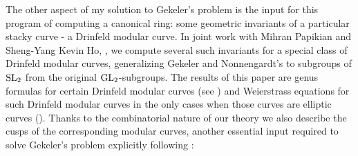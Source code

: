 \documentclass[12pt]{amsart}
\begin{document}
	 The other aspect of my solution to Gekeler's problem is the input for this program of computing a canonical ring: some geometric invariants of a particular stacky curve - a Drinfeld modular curve. In joint work with Mihran Papikian and Sheng-Yang Kevin Ho, \cite{Franklin-Ho-Papikian-DrinfeldCurves-SL}, we compute several such invariants for a special class of Drinfeld modular curves, generalizing Gekeler and Nonnengardt's \cite{Gekeler-Nonnengardt-BruhatTitsTrees} to subgroups of $\mathrm{SL}_2$ from the original $\mathrm{GL}_2$-subgroups. The results of this paper are genus formulas for certain Drinfeld modular curves (see \cite[Section $3$]{Franklin-Ho-Papikian-DrinfeldCurves-SL}) and Weierstrass equations for such Drinfeld modular curves in the only cases when those curves are elliptic curves (\cite[Section $4$]{Franklin-Ho-Papikian-DrinfeldCurves-SL}). Thanks to the combinatorial nature of our theory we also describe the cusps of the corresponding modular curves, another essential input required to solve Gekeler's problem explicitly following \cite{Franklin-geometry-Drinfeld-modular-forms}:
\end{document}
